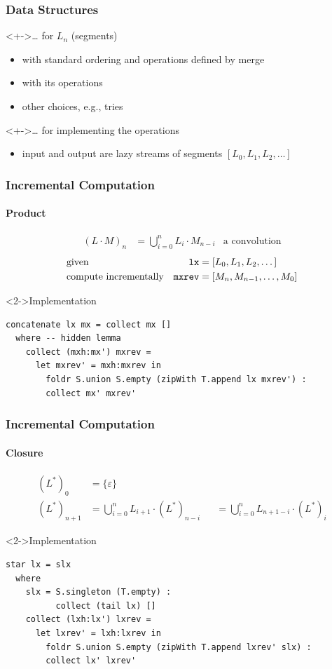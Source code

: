 \documentclass[pdftex,aspectratio=169]{beamer}
\begin{document}
\begin{frame}
  \frametitle{Data Structures}
  \begin{block}<+->{\dots{} for $L_n$ (segments)}
    \begin{itemize}
    \item \code{[T.Text]} with standard ordering and operations defined by merge
    \item {} with its operations
    \item other choices, e.g., tries
    \end{itemize}
  \end{block}
  \begin{block}<+->{\dots{} for implementing the operations}
    \begin{itemize}
    \item input and output are lazy streams of segments $[L_0, L_1, L_2, \dots]$
    \end{itemize}
  \end{block}
\end{frame}
\begin{frame}[fragile]
  \frametitle{Incremental Computation}
  \framesubtitle{Product}
  \vspace{-2\baselineskip}
  \begin{align*}
    (L \cdot M)_n & = \bigcup_{i=0}^n L_i \cdot M_{n-i} & \text{a convolution}
  \end{align*}
  \begin{align*}
    & \text{given} & \code{lx} &= [L_0, L_1, L_2, \dots ]\\
     & \text{compute incrementally} &
    \code{mxrev} &= [M_n, M_{n-1}, \dots , M_0]
  \end{align*}
  \begin{block}<2->{Implementation}
\begin{lstlisting}[numbers=none]
concatenate lx mx = collect mx []
  where -- hidden lemma
    collect (mxh:mx') mxrev =
      let mxrev' = mxh:mxrev in
        foldr S.union S.empty (zipWith T.append lx mxrev') :
        collect mx' mxrev'
\end{lstlisting}
  \end{block}
\end{frame}
\begin{frame}[fragile]
  \frametitle{Incremental Computation}
  \framesubtitle{Closure}
  \vspace{-2\baselineskip}
  \begin{align*}
    (L^*)_0 & = \{\varepsilon\} \\
    (L^*)_{n+1} & = \bigcup_{i=0}^n L_{i+1} \cdot (L^*)_{n-i}
                  &&= \bigcup_{i=0}^n L_{n+1-i} \cdot (L^*)_i
  \end{align*}
  \begin{block}<2->{Implementation}
\begin{lstlisting}[numbers=none]
star lx = slx
  where
    slx = S.singleton (T.empty) :
          collect (tail lx) []
    collect (lxh:lx') lxrev =
      let lxrev' = lxh:lxrev in
        foldr S.union S.empty (zipWith T.append lxrev' slx) :
        collect lx' lxrev'
\end{lstlisting}
  \end{block}
\end{frame}
\end{document}
